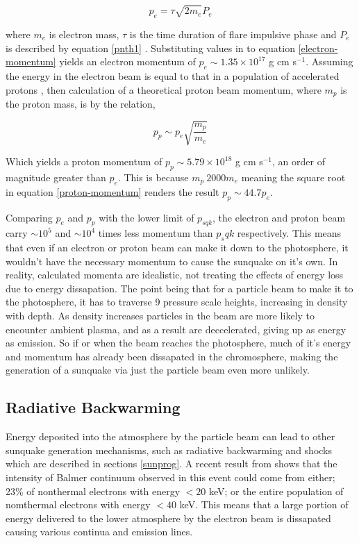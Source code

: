 \begin{equation}\label{electron-momentum}
p_e=\tau \sqrt{2m_e} P_{e}
\end{equation}

where $m_e$ is electron mass, $\tau$ is the time duration of flare impulsive phase and $P_{e}$ is described by equation \ref{pnth1} \citep{2015ApJ...807..102S}. Substituting values in to equation \ref{electron-momentum} yields an electron momentum of $p_e \sim 1.35{\times}10^{17}$ g cm s$^{-1}$. Assuming the energy in the electron beam is equal to that in a population of accelerated protons \citep{2000ApJ...542..513E}, then calculation of a theoretical proton beam momentum, where $m_p$ is the proton mass, is by the relation,

\begin{equation}\label{proton-momentum}
p_p \sim p_e \sqrt{\frac{m_p}{m_e}}
\end{equation}

Which yields a proton momentum of $p_p \sim 5.79{\times}10^18$ g cm s$^{-1}$, an order of magnitude greater than $p_e$. This is because $m_p ~ 2000m_e$ meaning the square root in equation \ref{proton-momentum} renders the result $p_p \sim 44.7p_e$. 

Comparing $p_{e}$ and $p_{p}$ with the lower limit of $p_{sqk}$, the electron and proton beam carry $\sim 10^{5}$ and $\sim 10^{4}$ times less momentum than $p_sqk$ respectively. This means that even if an electron or proton beam can make it down to the photosphere, it wouldn't have the necessary momentum to cause the sunquake on it's own. In reality, calculated momenta are idealistic, not treating the effects of energy loss due to energy dissapation. The point being that for a particle beam to make it to the photosphere, it has to traverse 9 pressure scale heights, increasing in density with depth. As density increases particles in the beam are more likely to encounter ambient plasma, and as a result are deccelerated, giving up as energy as emission. So if or when the beam reaches the photosphere, much of it's energy and momentum has already been dissapated in the chromosphere, making the generation of a sunquake via just the particle beam even more unlikely. \\

\subsection{Radiative Backwarming}
Energy deposited into the atmosphere by the particle beam can lead to other sunquake generation mechanisms, such as radiative backwarming and shocks which are described in sections \ref{sunprog}. A recent result from \cite{2016ApJ...816...88K} shows that the intensity of Balmer continuum observed in this event could come from either; 23\% of nonthermal electrons with energy $<20$ keV; or the entire population of nomthermal electrons with energy $<40$ keV. This means that a large portion of energy delivered to the lower atmosphere by the electron beam is dissapated causing various continua and emission lines. \\


